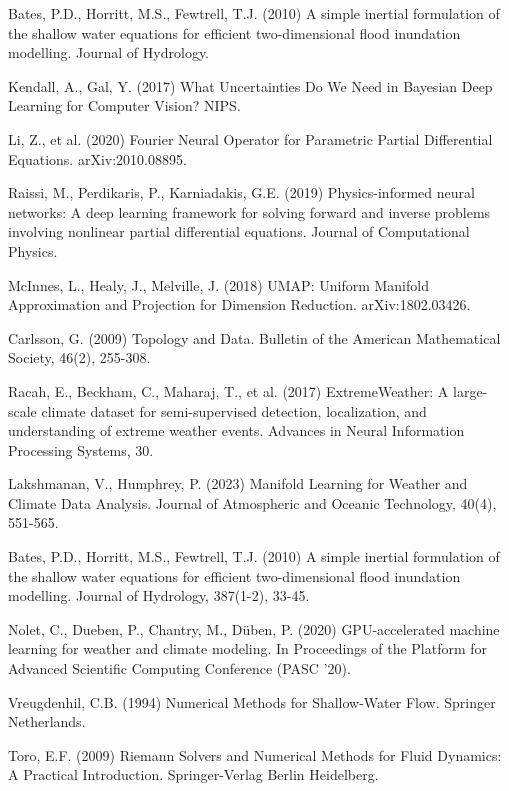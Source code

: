 \documentclass{article}
\begin{document}
\begin{thebibliography}{99}
 Bates, P.D., Horritt, M.S., Fewtrell, T.J. (2010) A simple inertial formulation of the shallow water equations for efficient two-dimensional flood inundation modelling. Journal of Hydrology.

 Kendall, A., Gal, Y. (2017) What Uncertainties Do We Need in Bayesian Deep Learning for Computer Vision? NIPS.

 Li, Z., et al. (2020) Fourier Neural Operator for Parametric Partial Differential Equations. arXiv:2010.08895.

 Raissi, M., Perdikaris, P., Karniadakis, G.E. (2019) Physics-informed neural networks: A deep learning framework for solving forward and inverse problems involving nonlinear partial differential equations. Journal of Computational Physics.

 McInnes, L., Healy, J., Melville, J. (2018) UMAP: Uniform Manifold Approximation and Projection for Dimension Reduction. arXiv:1802.03426.

 Carlsson, G. (2009) Topology and Data. Bulletin of the American Mathematical Society, 46(2), 255-308.

 Racah, E., Beckham, C., Maharaj, T., et al. (2017) ExtremeWeather: A large-scale climate dataset for semi-supervised detection, localization, and understanding of extreme weather events. Advances in Neural Information Processing Systems, 30.

 Lakshmanan, V., Humphrey, P. (2023) Manifold Learning for Weather and Climate Data Analysis. Journal of Atmospheric and Oceanic Technology, 40(4), 551-565.

 Bates, P.D., Horritt, M.S., Fewtrell, T.J. (2010) A simple inertial formulation of the shallow water equations for efficient two-dimensional flood inundation modelling. Journal of Hydrology, 387(1-2), 33-45.

 Nolet, C., Dueben, P., Chantry, M., Düben, P. (2020) GPU-accelerated machine learning for weather and climate modeling. In Proceedings of the Platform for Advanced Scientific Computing Conference (PASC '20).

 Vreugdenhil, C.B. (1994) Numerical Methods for Shallow-Water Flow. Springer Netherlands.

 Toro, E.F. (2009) Riemann Solvers and Numerical Methods for Fluid Dynamics: A Practical Introduction. Springer-Verlag Berlin Heidelberg.

\end{thebibliography}
\end{document}
